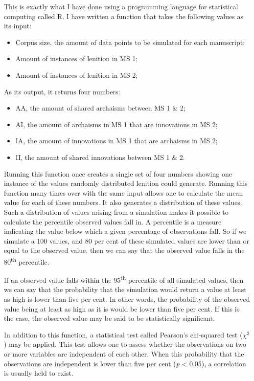 This is exactly what I have done using a programming language for statistical computing called R. I have written a function that takes the following values as its input:
\begin{itemize}
\item Corpus size, \ie the amount of data points to be simulated for
  each manuscript;
\item Amount of instances of lenition in MS 1;
\item Amount of instances of lenition in MS 2;
\end{itemize}
As its output, it returns four numbers:
\begin{itemize}
\item AA, \ie the amount of shared archaisms between MS 1 \& 2;
\item AI, \ie the amount of archaisms in MS 1 that are innovations in MS 2;
\item IA, \ie the amount of innovations in MS 1 that are archaisms in MS 2;
\item II, \ie the amount of shared innovations between MS 1 \& 2.
\end{itemize}

Running this function once creates a single set of four numbers showing one instance of the values randomly distributed lenition could generate. Running this function many times over with the same input allows one to calculate the mean value for each of these numbers. It also generates a distribution of these values. Such a distribution of values arising from a simulation makes it possible to calculate the percentile observed values fall in. A percentile is a measure indicating the value below which a given percentage of observations fall. So if we simulate a 100 values, and 80 per cent of these simulated values are lower than or equal to the observed value, then we can say that the observed value falls in the 80\textsuperscript{th} percentile.

If an observed value falls within the 95\textsuperscript{th} percentile of all simulated values, then we can say that the probability that the simulation would return a value at least as high is lower than five per cent. In other words, the probability of the observed value being at least as high as it is would be lower than five per cent. If this is the case, the observed value may be said to be statistically significant.

In addition to this function, a statistical test called Pearson's chi-squared test (\(\chi^2\)) may be applied. This test allows one to assess whether the  observations on two or more variables are independent of each other. When this probability that the observations are independent is lower than five per cent (\emph{p} < 0.05), a correlation is usually held to exist.

